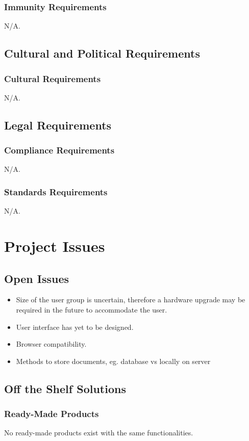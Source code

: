 \documentclass[12pt, titlepage]{article}
\begin{document}
{\subsubsection{Immunity Requirements}
N/A.
\subsection{Cultural and Political Requirements}
\subsubsection{Cultural Requirements}
N/A.
\subsection{Legal Requirements}
\subsubsection{Compliance Requirements}
N/A.
\subsubsection{Standards Requirements}
N/A.

\section{Project Issues}
\subsection{Open Issues}
\begin{itemize}
  \item Size of the user group is uncertain, therefore a hardware upgrade may be 
required in the future to accommodate the user.
  \item User interface has yet to be designed.
  \item Browser compatibility.
  \item Methods to store documents, eg. database vs locally on server
\end{itemize}

\subsection{Off the Shelf Solutions}
\subsubsection{Ready-Made Products}
No ready-made products exist with the same functionalities. 
}
\end{document}
